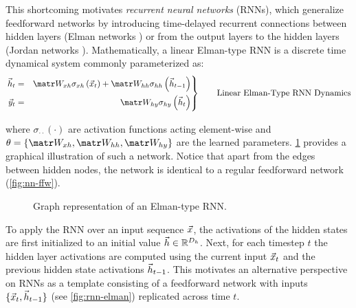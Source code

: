 This shortcoming motivates \emph{recurrent neural networks} (RNNs), which
generalize feedforward networks by introducing time-delayed recurrent
connections between hidden layers (Elman networks \citep{elman1990finding}) or
from the output layers to the hidden layers (Jordan networks
\citep{jordan1997serial}). Mathematically, a linear Elman-type RNN is a discrete time
dynamical system commonly parameterized as:
\begin{equation}
 \left.\begin{aligned}
          \h_t &=& \W_{xh} \sigma_{xh} \left( \x_t \right) + \W_{hh} \sigma_{hh} \left( \h_{t-1} \right)\\
          \y_t &=& \W_{hy} \sigma_{hy} \left( \h_t \right)
       \end{aligned}
 \right\}
 \qquad \text{Linear Elman-Type RNN Dynamics}
\end{equation}
\begin{align}
\end{align}
where $\sigma_{\cdot \cdot}(\cdot)$ are activation functions acting
element-wise and $\theta = \{ \W_{xh}, \W_{hh}, \W_{hy}\}$ are the learned
parameters. \cref{fig:nn-rnn} provides a graphical illustration of such a
network. Notice that apart from the edges between hidden nodes, the network is
identical to a regular feedforward network (\cref{fig:nn-ffw}).

\begin{figure}[tb]
    \centering
    
    \caption{Graph representation of an Elman-type RNN.}
    \label{fig:nn-rnn}
\end{figure}

To apply the RNN over an input sequence $\vec{x}$, the activations of the hidden
states are first initialized to an initial value $\vec{h} \in \mathbb{R}^{D_{h}}$. Next,
for each timestep $t$ the hidden layer activations are computed using the
current input $\vec{x}_t$ and the previous hidden state activations $\vec{h}_{t-1}$.
This motivates an alternative perspective on RNNs as a template consisting
of a feedforward network with inputs $\{\vec{x}_t, \vec{h}_{t-1}\}$ (see
\vref{fig:rnn-elman}) replicated across time $t$.
